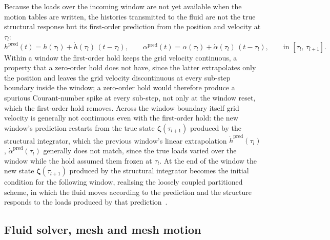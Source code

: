 Because the loads over the incoming window are not yet available when the motion tables are written, the histories transmitted to the fluid are not the true structural response but its first-order prediction from the position and velocity at $\tau_l$:
\begin{equation}
    h^{\mathrm{pred}}(t) = h(\tau_l) + \dot h(\tau_l)\,(t - \tau_l),
    \qquad
    \alpha^{\mathrm{pred}}(t) = \alpha(\tau_l) + \dot\alpha(\tau_l)\,(t - \tau_l),
    \qquad \text{in } [\tau_l,\,\tau_{l+1}].
    \label{eq:first-order-hold}
\end{equation}
Within a window the first-order hold keeps the grid velocity continuous, a property that a zero-order hold does not have, since the latter extrapolates only the position and leaves the grid velocity discontinuous at every sub-step boundary inside the window; a zero-order hold would therefore produce a spurious Courant-number spike at every sub-step, not only at the window reset, which the first-order hold removes. Across the window boundary itself grid velocity is generally not continuous even with the first-order hold: the new window's prediction restarts from the true state $\boldsymbol{\zeta}(\tau_{l+1})$ produced by the structural integrator, which the previous window's linear extrapolation $\dot h^{\mathrm{pred}}(\tau_l)$, $\dot\alpha^{\mathrm{pred}}(\tau_l)$ generally does not match, since the true loads varied over the window while the hold assumed them frozen at $\tau_l$. At the end of the window the new state $\boldsymbol{\zeta}(\tau_{l+1})$ produced by the structural integrator becomes the initial condition for the following window, realising the loosely coupled partitioned scheme, in which the fluid moves according to the prediction and the structure responds to the loads produced by that prediction~\cite{farhat2006secondorder}.

\subsection{Fluid solver, mesh and mesh motion}
\label{openfoam}
\label{subsubsec:fluidsolver}


